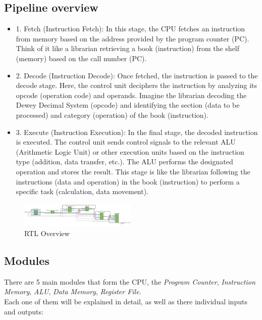 \documentclass[9pt,a4paper,twoside]{tau}
\begin{document}
\subsection{Pipeline overview}
    \begin{itemize}
        \item 1. Fetch (Instruction Fetch):
        In this stage, the CPU fetches an instruction from memory based on the address provided by the program counter (PC). Think of it like a librarian retrieving a book (instruction) from the shelf (memory) based on the call number (PC).
        \item 2. Decode (Instruction Decode): Once fetched, the instruction is passed to the decode stage. Here, the control unit deciphers the instruction by analyzing its opcode (operation code) and operands.
        Imagine the librarian decoding the Dewey Decimal System (opcode) and identifying the section (data to be processed) and category (operation) of the book (instruction).
        \item 3. Execute (Instruction Execution): In the final stage, the decoded instruction is executed. The control unit sends control signals to the relevant ALU (Arithmetic Logic Unit) or other execution units based on the instruction type (addition, data transfer, etc.). The ALU performs the designated operation and stores the result. This stage is like the librarian following the instructions (data and operation) in the book (instruction) to perform a specific task (calculation, data movement).
    
    \end{itemize}
    

\begin{figure}[h]  %
    \centering  %
    \includegraphics[width=0.5\textwidth]{images/RTLImg.png}
    \caption{RTL Overview}
    \label{fig:RTL Overview}
\end{figure}





\subsection{Modules}
There are 5 main modules that form the CPU, the \textit{Program Counter}, \textit{Instruction Memory}, \textit{ALU}, \textit{Data Memory}, \textit{Register File}.\\ Each one of them will be explained in detail, as well as there individual inputs and outputs:
\end{document}
